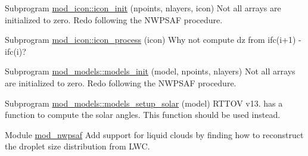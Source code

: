 
\begin{DoxyRefList}
\item[Subprogram \mbox{\hyperlink{namespacemod__icon_a3f39934ffaccaed8733b57d81cc1bf85}{mod\+\_\+icon\+::icon\+\_\+init}} (npoints, nlayers, icon)]\label{todo__todo000004}%
%
Not all arrays are initialized to zero. Redo following the NWPSAF procedure.  
\item[Subprogram \mbox{\hyperlink{namespacemod__icon_a643091b127fab3797b3b87910dfaf3a4}{mod\+\_\+icon\+::icon\+\_\+process}} (icon)]\label{todo__todo000003}%
%
Why not compute dz from ifc(i+1) -\/ ifc(i)?  
\item[Subprogram \mbox{\hyperlink{namespacemod__models_ad5af6704929fde58c81a3f945c038e5c}{mod\+\_\+models\+::models\+\_\+init}} (model, npoints, nlayers)]\label{todo__todo000001}%
%
Not all arrays are initialized to zero. Redo following the NWPSAF procedure.  
\item[Subprogram \mbox{\hyperlink{namespacemod__models_a80d4eac735218c71f718fecf34642235}{mod\+\_\+models\+::models\+\_\+setup\+\_\+solar}} (model)]\label{todo__todo000002}%
%
RTTOV v13. has a function to compute the solar angles. This function should be used instead.  
\item[Module \mbox{\hyperlink{namespacemod__nwpsaf}{mod\+\_\+nwpsaf}} ]\label{todo__todo000005}%
%
Add support for liquid clouds by finding how to reconstruct the droplet size distribution from LWC. 
\end{DoxyRefList}